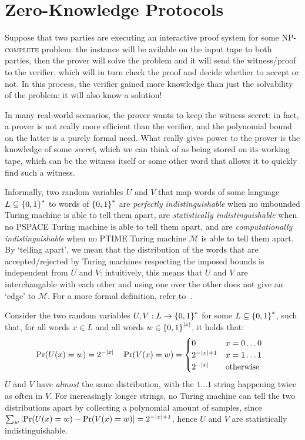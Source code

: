 \section{Zero-Knowledge Protocols}
Suppose that two parties are executing an interactive proof system for some \textsc{NP-complete} 
problem: the instance will be avilable on the input tape to both parties, then the prover will 
solve the problem and it will send the witness/proof to the verifier, which will in turn check the 
proof and decide whether to accept or not.
In this process, the verifier gained more knowledge than just the solvability of the problem: it 
will also know a solution!

In many real-world scenarios, the prover wants to keep the witness secret:
in fact, a prover is not really more efficient than the verifier, and the polynomial bound 
on the latter is a purely formal need.
What really gives power to the prover is the knowledge of some \emph{secret}, which we can 
think of as being stored on its working tape, which can be the witness itself or some other 
word that allows it to quickly find such a witness.

Informally, two random variables \(U\) and \(V\) that map words of some language 
\(L \subseteq \left\{0, 1\right\}^{*}\) to words of \(\left\{0, 1\right\}^{*}\) are 
\emph{perfectly indistinguishable} when no unbounded Turing machine is able to tell them apart,
are \emph{statistically indistinguishable} when no \textsc{PSPACE} Turing machine is able to 
tell them apart, and are \emph{computationally indistinguishable} when no \textsc{PTIME} Turing 
machine \(\mathcal{M}\) is able to tell them apart.
By `telling apart', we mean that the distribution of the words that are accepted/rejected 
by Turing machines respecting the imposed bounds is independent from \(U\) and \(V\): intuitively,
this means that \(U\) and \(V\) are interchangable with each other and using one over the other 
does not give an `edge' to \(\mathcal{M}\).
For a more formal definition, refer to~\cite{GoldwasserM1984,GoldwasserMR1989,Yao1982}.
\begin{example}
  Consider the two random variables \(U, V: L \to \left\{0, 1\right\}^{*}\) for some 
  \(L \subseteq \left\{0, 1\right\}^{*}\), such that, for all words \(x \in L\) and all words 
  \(w \in \left\{0, 1\right\}^{\left\lvert x\right\rvert}\), it holds that:
  \begin{align*}
    & \call{\Pr}{\call{U}{x} = w} = 2^{-\abs{x}} &&
    \call{\Pr}{\call{V}{x} = w} = \begin{cases}
      0 & x = 0\dots0 \\
      2^{-\abs{x} + 1} & x = 1\dots1 \\
      2^{-\abs{x}} & \textrm{otherwise}
    \end{cases}
  \end{align*}
  \(U\) and \(V\) have \emph{almost} the same distribution, with the \(1\dots1\) string 
  happening twice as often in \(V\). 
  For increasingly longer strings, no Turing machine can tell the two distributions apart by 
  collecting a polynomial amount of samples, since 
  \(\sum_{w}{\abs{\call{\Pr}{\call{U}{x} = w} - \call{\Pr}{\call{V}{x} = w}}} = 2^{-\abs{x}+1}\),
  hence \(U\) and \(V\) are statistically indistinguishable.
\end{example}

